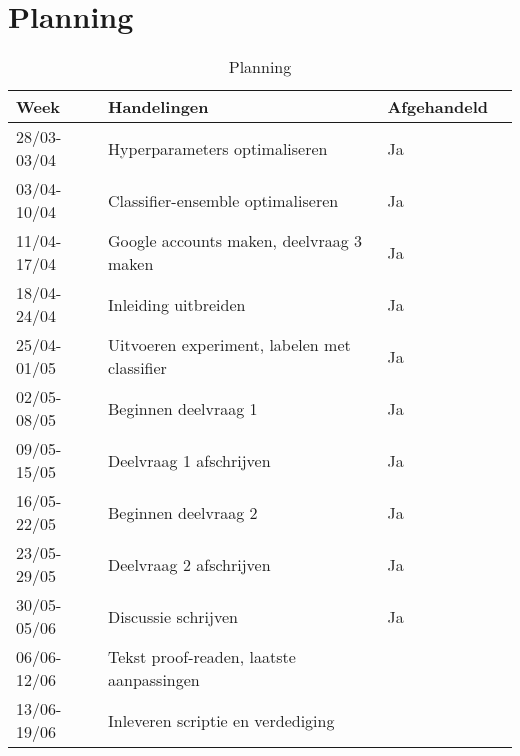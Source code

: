 \documentclass[../main.tex]{subfiles}
\begin{document}
\section{Planning}

\begin{table}[!b]
\centering
\caption{Planning}
\label{tab:planning}
\begin{tabular}{@{}ll@{}ll@{}}
\toprule
Week        & Handelingen                                                     & Afgehandeld \\ \midrule
28/03-03/04 & Hyperparameters optimaliseren                                   &     Ja      \\
03/04-10/04 & Classifier-ensemble optimaliseren                               &     Ja      \\
11/04-17/04 & Google accounts maken, deelvraag 3 maken                        &     Ja      \\
18/04-24/04 & Inleiding uitbreiden                                            &     Ja      \\
25/04-01/05 & Uitvoeren experiment, labelen met classifier                    &     Ja      \\
02/05-08/05 & Beginnen deelvraag 1                                            &     Ja      \\
09/05-15/05 & Deelvraag 1 afschrijven                                         &     Ja      \\
16/05-22/05 & Beginnen deelvraag 2                                            &     Ja      \\
23/05-29/05 & Deelvraag 2 afschrijven                                         &     Ja      \\
30/05-05/06 & Discussie schrijven                                             &     Ja      \\
06/06-12/06 & Tekst proof-readen, laatste aanpassingen                        &             \\
13/06-19/06 & Inleveren scriptie en verdediging                               &             \\ \bottomrule
\end{tabular}

\end{table}
\end{document}
